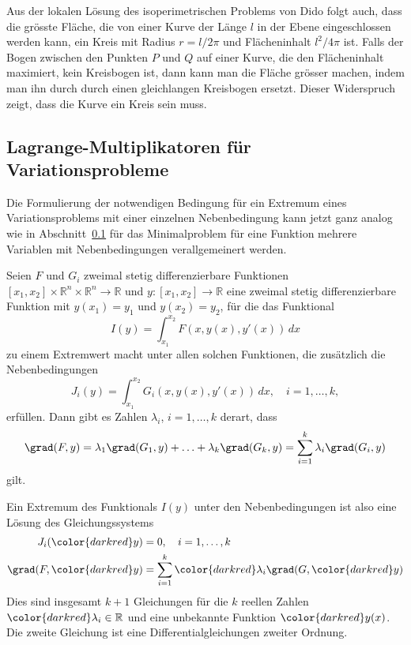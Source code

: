 Aus der lokalen Lösung des isoperimetrischen Problems von Dido
folgt auch, dass die grösste Fläche, die von einer Kurve der Länge
$l$ in der Ebene eingeschlossen werden kann, ein Kreis mit Radius
$r=l/2\pi$ und Flächeninhalt $l^2/4\pi$ ist.
Falls der Bogen zwischen den Punkten $P$ und $Q$ auf einer Kurve, die
den Flächeninhalt maximiert, kein Kreisbogen ist, dann kann man die
Fläche grösser machen, indem man ihn durch durch einen gleichlangen
Kreisbogen ersetzt.
Dieser Widerspruch zeigt, dass die Kurve ein Kreis sein muss.

%
%
\subsection{Lagrange-Multiplikatoren für Variationsprobleme
\label{buch:nebenbedingungen:lagrangemult:subsection:lagrangemult}}
Die Formulierung der notwendigen Bedingung für ein Extremum eines
Variationsproblems mit einer einzelnen Nebenbedingung kann jetzt
ganz analog wie in Abschnitt~\ref{} für das Minimalproblem für eine
Funktion mehrere Variablen mit Nebenbedingungen verallgemeinert
werden.

\begin{satz}
Seien $F$ und $G_i$ zweimal stetig differenzierbare Funktionen
$[x_1,x_2]\times\mathbb{R}^n\times\mathbb{R}^n\to\mathbb{R}$
und $y\colon[x_1,x_2]\to\mathbb{R}$ eine zweimal stetig
differenzierbare Funktion mit $y(x_1)=y_1$ und $y(x_2)=y_2$, für die
das Funktional
\[
I(y)
=
\int_{x_1}^{x_2} F(x,y(x),y'(x))\,dx
\]
zu einem Extremwert macht unter allen solchen Funktionen, die zusätzlich
die Nebenbedingungen
\[
J_i(y)
=
\int_{x_1}^{x_2}
G_i(x,y(x),y'(x))\,dx,
\quad
i=1,\dots,k,
\]
erfüllen.
Dann gibt es Zahlen $\lambda_i$, $i=1,\dots,k$ derart, dass
\[
\grad(F,y)
=
\lambda_1\grad(G_1,y)+\ldots+\lambda_k\grad(G_k,y)
=
\sum_{i=1}^k \lambda_i \grad(G_i,y)
\]
gilt.
\end{satz}

Ein Extremum des Funktionals $I(y)$ unter den Nebenbedingungen ist
also eine Lösung des Gleichungssystems
\begin{align}
J_i({\color{darkred}y})&=0,\quad i=1,\dots,k\\
\grad(F,{\color{darkred}y})
&=\sum_{i=1}^k {\color{darkred}\lambda_i} \grad(G,{\color{darkred}y})
\end{align}
Dies sind insgesamt $k+1$ Gleichungen für die $k$ reellen Zahlen
${\color{darkred}\lambda_i}\in\mathbb{R}$ und eine unbekannte Funktion
${\color{darkred}y(x)}$.
Die zweite Gleichung ist eine Differentialgleichungen zweiter Ordnung.



